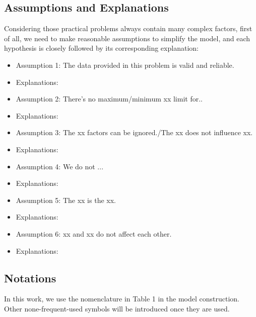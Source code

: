 \documentclass[12pt]{article}  %
\begin{document}
\subsection{Assumptions and Explanations}
Considering those practical problems always contain many complex factors, first of all, we need to make reasonable assumptions to simplify the model, and each hypothesis is closely followed by its corresponding explanation:
\begin{itemize}
	\setlength{\parsep}{0ex} %
	\setlength{\topsep}{2ex} %
	\setlength{\itemsep}{1ex} %
	\item Assumption 1: The data provided in this problem is valid and reliable.
	\item Explanations:
	\item Assumption 2: There's no maximum/minimum xx limit for..
	\item Explanations:
	\item Assumption 3: The xx factors can be ignored./The xx does not influence xx.
	\item Explanations:
	\item Assumption 4: We do not ...
	\item Explanations:
	\item Assumption 5: The xx is the xx.
	\item Explanations:
	\item Assumption 6: xx and xx do not affect each other.
	\item Explanations:
\end{itemize}



\subsection{Notations}
In this work, we use the nomenclature in Table 1 in the model construction. Other none-frequent-used symbols will be introduced once they are used.


\end{document}
